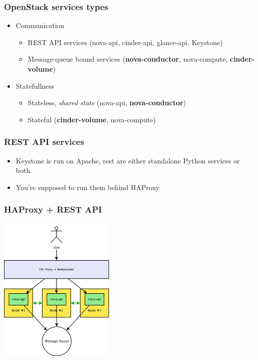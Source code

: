\documentclass[aspectratio=169]{beamer}
\begin{document}
\begin{frame}
    \frametitle{OpenStack services types}
    \begin{itemize}
        \item Communication
        \begin{itemize}
            \item REST API services (nova-api, cinder-api, glance-api, Keystone)
            \item Message-queue bound services (\textbf{nova-conductor}, nova-compute, \textbf{cinder-volume})
        \end{itemize}
        \pause
        \item Statefullness
        \begin{itemize}
            \item Stateless, \emph{shared state} (nova-api, \textbf{nova-conductor})
            \item Stateful (\textbf{cinder-volume}, nova-compute)
        \end{itemize}
    \end{itemize}
\end{frame}

\begin{frame}
    \frametitle{REST API services}
    \begin{itemize}
        \item Keystone is run on Apache, rest are either standalone Python services or both.
        \item You're supposed to run them behind HAProxy.
    \end{itemize}
\end{frame}

\begin{frame}
    \frametitle{HAProxy + REST API}
    \begin{center}
        \includegraphics[height=7cm]{images/haproxy1.png}
    \end{center}
\end{frame}
\end{document}
